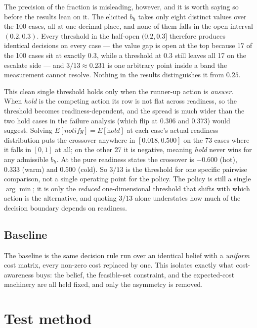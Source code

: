 \documentclass{article}
\begin{document}
The precision of the fraction is misleading, however, and it is worth saying so
before the results lean on it. The elicited $b_h$ takes only eight distinct values
over the 100 cases, all at one decimal place, and none of them falls in the open
interval $(0.2, 0.3)$. Every threshold in the half-open $(0.2, 0.3]$ therefore
produces identical decisions on every case --- the value gap is open at the top
because 17 of the 100 cases sit at exactly $0.3$, while a threshold at $0.3$ still
leaves all 17 on the escalate side --- and $3/13 \approx 0.231$ is one arbitrary
point inside a band the measurement cannot resolve. Nothing in the results
distinguishes it from
$0.25$.

This clean single threshold holds only when the runner-up action is
\emph{answer}. When \emph{hold} is the competing action its row is not flat
across readiness, so the threshold becomes readiness-dependent, and the spread is
much wider than the two hold cases in the failure analysis (which flip at 0.306
and 0.373) would suggest. Solving $E[\textit{notify}] = E[\textit{hold}]$ at each
case's actual readiness distribution puts the crossover anywhere in
$[0.018, 0.500]$ on the 73 cases where it falls in $[0, 1]$ at all; on the other
27 it is negative, meaning \emph{hold} never wins for any admissible $b_h$. At the
pure readiness states the crossover is $-0.600$ (hot), $0.333$ (warm) and $0.500$
(cold). So $3/13$ is the threshold for one specific pairwise comparison, not a
single operating point for the policy. The policy is still a single $\arg\min$; it
is only the \emph{reduced} one-dimensional threshold that shifts with which action
is the alternative, and quoting $3/13$ alone understates how much of the decision
boundary depends on readiness.

\subsection{Baseline}
The baseline is the same decision rule run over an identical belief with a
\emph{uniform} cost matrix, every non-zero cost replaced by one. This isolates
exactly what cost-awareness buys: the belief, the feasible-set constraint, and
the expected-cost machinery are all held fixed, and only the asymmetry is
removed.
\section{Test method}
\label{sec:method}
\end{document}
